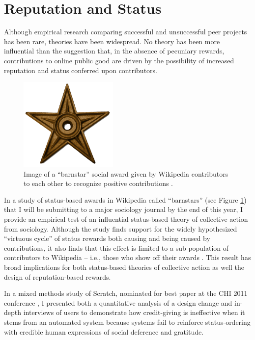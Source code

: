 \documentclass[10pt]{memoir}
\begin{document}
\section{Reputation and Status}

Although empirical research comparing successful and unsuccessful peer
projects has been rare, theories have been widespread. No theory has
been more influential than the suggestion that, in the absence of
pecuniary rewards, contributions to online public good are driven by
the possibility of increased reputation and status conferred upon
contributors.

\begin{figure}
 \vspace{-1em}
 \begin{centering}
 \includegraphics[width=1.9in]{figures/barnstar_alone.png}
 \caption{Image of a ``barnstar'' social award given by Wikipedia
   contributors to each other to recognize positive contributions .}
 \label{fig:barnstar}
 \end{centering}
 \vspace{-1em}
\end{figure}

In a study of status-based awards in Wikipedia called ``barnstars''
(see Figure \ref{fig:barnstar}) that I will be submitting to a major
sociology journal by the end of this year, I provide an empirical test
of an influential status-based theory of collective action from
sociology. Although the study finds support for the widely
hypothesized ``virtuous cycle'' of status rewards both causing and
being caused by contributions, it also finds that this effect is
limited to a sub-population of contributors to Wikipedia -- i.e.,
those who show off their awards \cite{hill_status_2012}. This result
has broad implications for both status-based theories of collective
action as well the design of reputation-based rewards.

In a mixed methods study of Scratch, nominated for best paper at the
CHI 2011 conference \cite{monroy-hernandez_computers_2011}, I
presented both a quantitative analysis of a design change and in-depth
interviews of users to demonstrate how credit-giving is ineffective
when it stems from an automated system because systems fail to
reinforce status-ordering with credible human expressions of social
deference and gratitude.
\end{document}
